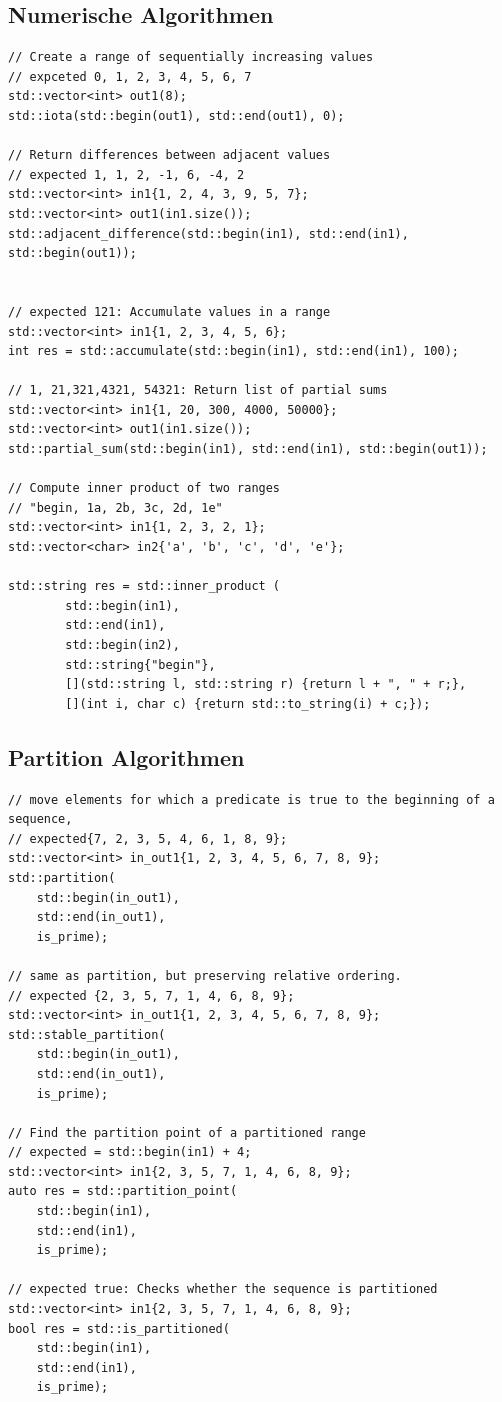 \subsection{Numerische Algorithmen}
\begin{lstlisting}
// Create a range of sequentially increasing values
// expceted 0, 1, 2, 3, 4, 5, 6, 7
std::vector<int> out1(8);
std::iota(std::begin(out1), std::end(out1), 0);

// Return differences between adjacent values
// expected 1, 1, 2, -1, 6, -4, 2
std::vector<int> in1{1, 2, 4, 3, 9, 5, 7};
std::vector<int> out1(in1.size());
std::adjacent_difference(std::begin(in1), std::end(in1), 	std::begin(out1));


// expected 121: Accumulate values in a range
std::vector<int> in1{1, 2, 3, 4, 5, 6};
int res = std::accumulate(std::begin(in1), std::end(in1), 100);

// 1, 21,321,4321, 54321: Return list of partial sums
std::vector<int> in1{1, 20, 300, 4000, 50000};
std::vector<int> out1(in1.size());
std::partial_sum(std::begin(in1), std::end(in1), std::begin(out1));

// Compute inner product of two ranges
// "begin, 1a, 2b, 3c, 2d, 1e"
std::vector<int> in1{1, 2, 3, 2, 1};
std::vector<char> in2{'a', 'b', 'c', 'd', 'e'};

std::string res = std::inner_product (
		std::begin(in1),
		std::end(in1),
		std::begin(in2),
		std::string{"begin"},
		[](std::string l, std::string r) {return l + ", " + r;},
		[](int i, char c) {return std::to_string(i) + c;});
\end{lstlisting}

\newpage
\subsection{Partition Algorithmen}
\begin{lstlisting}
// move elements for which a predicate is true to the beginning of a sequence,
// expected{7, 2, 3, 5, 4, 6, 1, 8, 9};
std::vector<int> in_out1{1, 2, 3, 4, 5, 6, 7, 8, 9};
std::partition(
	std::begin(in_out1),
	std::end(in_out1),
	is_prime);
	
// same as partition, but preserving relative ordering.
// expected {2, 3, 5, 7, 1, 4, 6, 8, 9};
std::vector<int> in_out1{1, 2, 3, 4, 5, 6, 7, 8, 9};
std::stable_partition(
	std::begin(in_out1),
	std::end(in_out1),
	is_prime);

// Find the partition point of a partitioned range
// expected = std::begin(in1) + 4;
std::vector<int> in1{2, 3, 5, 7, 1, 4, 6, 8, 9};
auto res = std::partition_point(
	std::begin(in1),
	std::end(in1),
	is_prime);
	
// expected true: Checks whether the sequence is partitioned
std::vector<int> in1{2, 3, 5, 7, 1, 4, 6, 8, 9};
bool res = std::is_partitioned(
	std::begin(in1),
	std::end(in1),
	is_prime);
\end{lstlisting}

